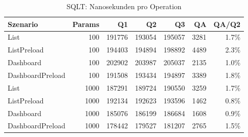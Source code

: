 \begin{table}[ht]
\centering
\caption{SQLT: Nanosekunden pro Operation}
\begin{tabular}{lrrrrrr}
\toprule
Szenario & Params & Q1 & Q2 & Q3 & QA & QA/Q2 \\
\midrule
		List & 100 & 191776 & 193054 & 195057 & 3281 & 1.7\% \\
		ListPreload & 100 & 194403 & 194894 & 198892 & 4489 & 2.3\% \\
		Dashboard & 100 & 202902 & 203987 & 205037 & 2135 & 1.0\% \\
		DashboardPreload & 100 & 191508 & 193434 & 194897 & 3389 & 1.8\% \\
		List & 1000 & 187291 & 189724 & 190550 & 3259 & 1.7\% \\
		ListPreload & 1000 & 192134 & 192623 & 193596 & 1462 & 0.8\% \\
		Dashboard & 1000 & 185076 & 186199 & 186684 & 1608 & 0.9\% \\
		DashboardPreload & 1000 & 178442 & 179527 & 181207 & 2765 & 1.5\% \\
\bottomrule
\end{tabular}
\label{tab:benchmark_sqlt_nsperop}
\end{table}
	